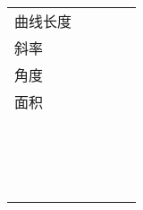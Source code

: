 \begin{center}
\begin{longtable}{p{1.57cm}<{\centering}p{4.07cm}<{\centering}p{2.07cm}<{\centering}p{4.07cm}<{\centering}p{2.07cm}<{\centering}}
        \multirow{4}[0]{*}{曲线长度} &       &       &       &  \\
            &       &       &       &  \\
            &       &       &       &  \\
            &       &       &       &  \\
        \multirow{4}[0]{*}{斜率} &       &       &       &  \\
            &       &       &       &  \\
            &       &       &       &  \\
            &       &       &       &  \\
        \multirow{4}[0]{*}{角度} &       &       &       &  \\
            &       &       &       &  \\
            &       &       &       &  \\
            &       &       &       &  \\
        \multirow{4}[1]{*}{面积} &       &       &       &  \\
        &       &       &       &  \\
        &       &       &       &  \\
        &       &       &       &  \\
        &       &       &       &  \\
        &       &       &       &  \\
        &       &       &       &  \\
        &       &       &       &  \\
        &       &       &       &  \\
        &       &       &       &  \\
        &       &       &       &  \\
        &       &       &       &  \\
        &       &       &       &  \\
        &       &       &       &  \\
        &       &       &       &  \\
        &       &       &       &  \\
        &       &       &       &  \\
        &       &       &       &  \\
        &       &       &       &  \\
        &       &       &       &  \\

\end{longtable}
\end{center}
